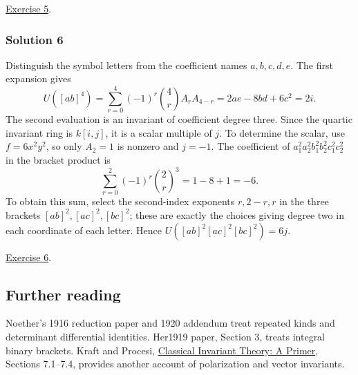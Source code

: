\documentclass[
]{article}
\begin{document}
\hyperref[exercise-5]{Exercise 5}.

\subsubsection{Solution 6}\label{solution-6}

Distinguish the symbol letters from the coefficient names \(a,b,c,d,e\).
The first expansion gives \[
U([ab]^4)=
\sum_{r=0}^4(-1)^r\binom4r A_rA_{4-r}
=2ae-8bd+6c^2=2i.
\] The second evaluation is an invariant of coefficient degree three.
Since the quartic invariant ring is \(k [i,j]\), it is a scalar multiple
of \(j\). To determine the scalar, use \(f=6x^2y^2\), so only \(A_2=1\)
is nonzero and \(j=-1\). The coefficient of
\(a_1^2a_2^2b_1^2b_2^2c_1^2c_2^2\) in the bracket product is \[
\sum_{r=0}^2(-1)^r\binom2r^3=1-8+1=-6.
\] To obtain this sum, select the second-index exponents \(r,2-r,r\) in
the three brackets \([ab]^2,[ac]^2,[bc]^2\); these are exactly the
choices giving degree two in each coordinate of each letter. Hence
\(U([ab]^2 [ac]^2 [bc]^2)=6j\).

\hyperref[exercise-6]{Exercise 6}.

\subsection{Further reading}\label{further-reading}

Noether's 1916 reduction paper and 1920 addendum treat repeated kinds
and determinant differential identities. Her1919 paper, Section 3,
treats integral binary brackets. Kraft and Procesi,
\href{https://dmi.unibas.ch/fileadmin/user_upload/dmi/Personen/Kraft_Hanspeter/Classical_Invariant_Theory.pdf}{Classical
Invariant Theory: A Primer}, Sections 7.1--7.4, provides another account
of polarization and vector invariants.
\end{document}
